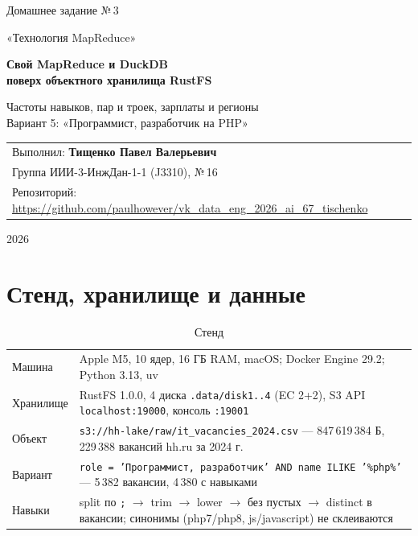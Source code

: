 \documentclass[11pt,a4paper]{article}
\newcommand{\code}[1]{\texttt{#1}}
\begin{document}
\begin{titlepage}
  \centering
  \vspace*{15mm}
  {\large Домашнее задание №\,3\par}
  {\large «Технология MapReduce»\par}
  \vspace{40mm}
  {\LARGE\bfseries Свой MapReduce и DuckDB\\[4pt] поверх объектного хранилища RustFS\par}
  \vspace{8mm}
  {\normalsize Частоты навыков, пар и троек, зарплаты и регионы\\ Вариант 5: «Программист, разработчик на PHP»\par}
  \vfill
  \begin{flushright}
    \begin{tabular}{@{}l@{}}
      Выполнил: \textbf{Тищенко Павел Валерьевич}\\
      Группа ИИИ-3-ИнжДан-1-1 (J3310), №\,16\\
      Репозиторий: \url{https://github.com/paulhowever/vk_data_eng_2026_ai_67_tischenko}
    \end{tabular}
  \end{flushright}
  \vspace{25mm}
  {2026\par}
\end{titlepage}

\section{Стенд, хранилище и данные}

\begin{table}[H]
\centering
\small
\caption{Стенд}
\begin{tabularx}{\linewidth}{@{}lL@{}}
\toprule
Машина & Apple M5, 10 ядер, 16 ГБ RAM, macOS; Docker Engine 29.2; Python 3.13, uv \\
Хранилище & RustFS 1.0.0, 4 диска \code{.data/disk1..4} (EC 2+2), S3 API \code{localhost:19000}, консоль \code{:19001} \\
Объект & \code{s3://hh-lake/raw/it\_vacancies\_2024.csv} --- 847\,619\,384 Б, 229\,388 вакансий hh.ru за 2024 г. \\
Вариант & \code{role = 'Программист, разработчик' AND name ILIKE '\%php\%'} --- 5\,382 вакансии, 4\,380 с навыками \\
Навыки & split по \code{;} $\to$ trim $\to$ lower $\to$ без пустых $\to$ distinct в вакансии; синонимы (php7/php8, js/javascript) не склеиваются \\
\bottomrule
\end{tabularx}
\end{table}
\end{document}

